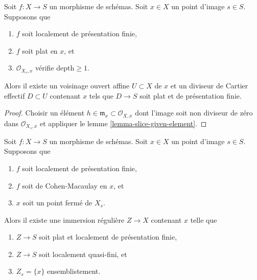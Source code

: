 \begin{lemma}
\label{lemma-slice-once}
Soit $f : X \to S$ un morphisme de schémas.
Soit $x \in X$ un point d'image $s \in S$.
Supposons que
\begin{enumerate}
\item $f$ soit localement de présentation finie,
\item $f$ soit plat en $x$, et
\item $\mathcal{O}_{X_s, x}$ vérifie $\text{depth} \geq 1$.
\end{enumerate}
Alors il existe un voisinage ouvert affine $U \subset X$ de $x$
et un diviseur de Cartier effectif $D \subset U$ contenant $x$ tels que
$D \to S$ soit plat et de présentation finie.
\end{lemma}

\begin{proof}
Choisir un élément $h \in \mathfrak m_x \subset \mathcal{O}_{X, x}$ dont
l'image soit non diviseur de zéro dans $\mathcal{O}_{X_s, x}$ et appliquer le
lemme \ref{lemma-slice-given-element}.
\end{proof}

\begin{lemma}
\label{lemma-slice-CM}
\begin{reference}
\cite[IV Proposition 17.16.1]{EGA}
\end{reference}
Soit $f : X \to S$ un morphisme de schémas.
Soit $x \in X$ un point d'image $s \in S$.
Supposons que
\begin{enumerate}
\item $f$ soit localement de présentation finie,
\item $f$ soit de Cohen-Macaulay en $x$, et
\item $x$ soit un point fermé de $X_s$.
\end{enumerate}
Alors il existe une immersion régulière $Z \to X$ contenant $x$ telle que
\begin{enumerate}
\item[(a)] $Z \to S$ soit plat et localement de présentation finie,
\item[(b)] $Z \to S$ soit localement quasi-fini, et
\item[(c)] $Z_s = \{x\}$ ensemblistement.
\end{enumerate}
\end{lemma}

